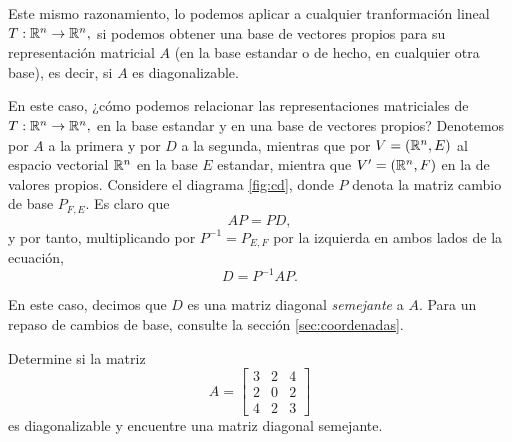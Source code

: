 Este mismo razonamiento, lo podemos aplicar a cualquier tranformación lineal $T:\mathbb{R}^{n} \to \mathbb{R}^{n},$ si podemos obtener
una base de vectores propios para su representación matricial $A$ (en la base estandar o de hecho, en cualquier otra
base), es decir, si $A$ es diagonalizable.



En este caso, ¿cómo podemos relacionar las representaciones matriciales de $T:\mathbb{R}^{n} \to \mathbb{R}^{n},$ en la base estandar y
en una base de vectores propios? Denotemos por $A$ a la primera y por $D$ a la segunda, mientras que por
$V=(\mathbb{R}^{n},E)$ al espacio vectorial $\mathbb{R}^{n}$ en la base $E$ estandar, mientra que $V'=(\mathbb{R}^{n}, F)$ en la de valores
propios. Considere el diagrama \ref{fig:cd}, donde $P$ denota la matriz cambio de base $P_{F,E}$. Es claro que
$$
AP=PD,
$$
y por tanto, multiplicando por $P^{-1}=P_{E,F}$ por la izquierda en ambos lados de la ecuación, $$D=P^{-1}AP.$$

En este caso, decimos que $D$ es una matriz diagonal \emph{semejante} a $A.$
Para un repaso de cambios de base, consulte la sección \ref{sec:coordenadas}.


\begin{problema}
 Determine si la matriz $$A=
\begin{bmatrix}
 3 & 2 & 4 \\
 2 & 0 & 2 \\
 4 & 2 & 3
\end{bmatrix}
 $$
 es diagonalizable y encuentre una matriz diagonal semejante.
\end{problema}

